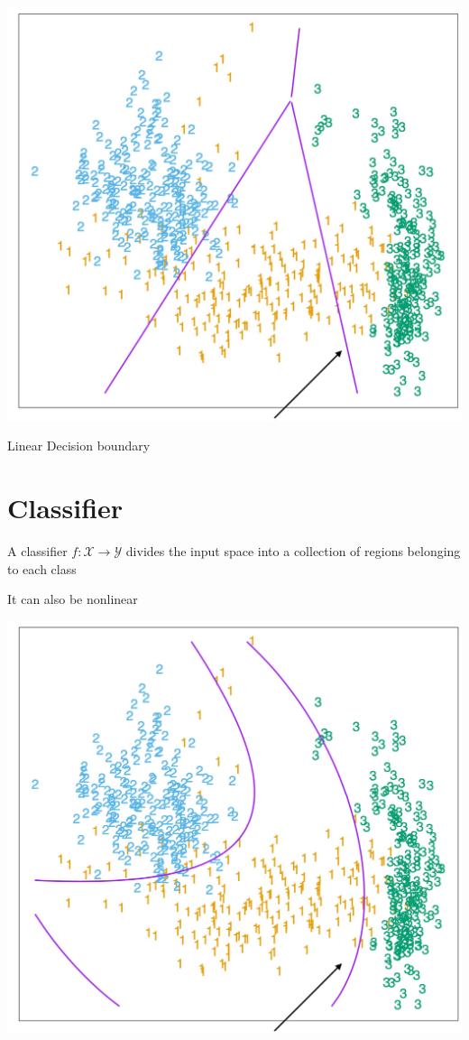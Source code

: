 \documentclass[10pt]{article}
\begin{document}
\begin{center}
\includegraphics[max width=\textwidth]{2023_12_30_cf784c471dfd1dd5afbag-08}
\end{center}

Linear Decision boundary

\section*{Classifier}
A classifier $f: \mathscr{X} \rightarrow \mathcal{Y}$ divides the input space into a collection of regions belonging to each class

It can also be nonlinear

\begin{center}
\includegraphics[max width=\textwidth]{2023_12_30_cf784c471dfd1dd5afbag-09}
\end{center}
\end{document}

